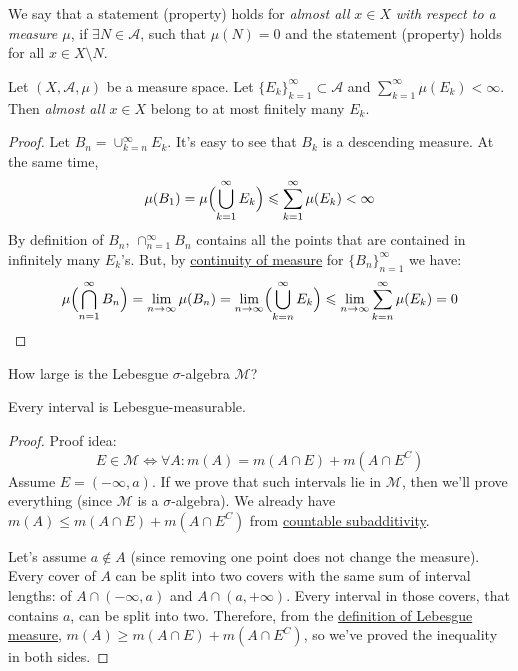 \begin{definition}
    We say that a statement (property) holds for \textit{almost all} $x \in X$
    \textit{with respect to a measure $\mu$}, if
    $\exists N \in \mathcal{A}$, such that $\mu(N) = 0$ and the statement (property)
    holds for all $x \in X \setminus N$.
\end{definition}
\begin{lemma}
    Let $(X, \mathcal{A}, \mu)$ be a measure space. Let
    $\{E_k\}_{k=1}^\infty \subset \mathcal{A}$ and $\sum_{k=1}^\infty \mu(E_k) < \infty$.
    Then \textit{almost all} $x \in X$ belong to at most finitely many $E_k$.
\end{lemma}
\begin{proof}
    Let $B_n = \cup_{k=n}^\infty E_k$. It's easy to see that $B_k$ is a descending measure.
    At the same time,
    \[ \mu(B_1) = \mu\Bigl(\bigcup_{k=1}^\infty E_k\Bigr) \le \sum_{k=1}^\infty \mu(E_k) < \infty \]
    By definition of $B_n$, $\cap_{n=1}^\infty B_n$ contains all the points
    that are contained in infinitely many $E_k$'s. But, by \hyperref[the:continuityOfMeasure]{continuity of measure} 
    for $\{B_n\}_{n=1}^\infty$ we have:
    \[ 
        \mu\Bigl(\bigcap_{n=1}^\infty B_n\Bigr) =
        \lim_{n \to \infty} \mu(B_n) =
        \lim_{n \to \infty} \Bigl(\bigcup_{k=n}^\infty E_k\Bigr) \le
        \lim_{n \to \infty} \sum_{k=n}^\infty \mu(E_k) = 0
    \]
\end{proof}

How large is the Lebesgue $\sigma$-algebra $\mathcal{M}$?
\begin{proposition}
    \label{prop:intervalsAreMeasurable}
    Every interval is Lebesgue-measurable.
\end{proposition}
\begin{proof}
    Proof idea:
    \[ 
        E \in \mathcal{M} \Longleftrightarrow 
        \forall A: m(A) = m(A \cap E) + m(A \cap E^C)
    \]
    Assume $E = (-\infty, a)$. If we prove that such intervals lie in $\mathcal{M}$, 
    then we'll prove everything (since $\mathcal{M}$ is a $\sigma$-algebra).
    We already have $m(A) \le m(A \cap E) + m(A \cap E^C)$ from \hyperref[the:countableSubadditivity]{countable subadditivity}.

    Let's assume $a \not\in A$ (since removing one point does not change the measure).
    Every cover of $A$ can be split into two covers with the same sum of interval lengths: of
    $A \cap (-\infty, a)$ and $A \cap (a, +\infty)$. Every interval in those
    covers, that contains $a$, can be split into two. Therefore,
    from the \hyperref[def:measurable]{definition of Lebesgue measure}, 
    $m(A) \ge m(A \cap E) + m(A \cap E^C)$, so we've proved the inequality in both sides.
\end{proof}